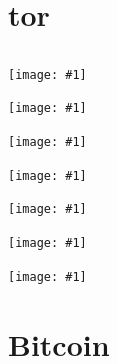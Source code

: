 \documentclass[12pt,english]{beamer}
\newcommand {\framedgraphic}[1] {
    \begin{frame}
        \begin{center}
            \texttt{[image: \#1]}
        \end{center}
    \end{frame}
}
\begin{document}
\section{tor}
\subsection{}

\framedgraphic{./img/tor_presentation/s1.png}

\framedgraphic{./img/tor_presentation/s2.png}

\framedgraphic{./img/tor_presentation/s3.png}

\framedgraphic{./img/tor_presentation/s4.png}

\framedgraphic{./img/tor_presentation/s5.png}

\framedgraphic{./img/tor_presentation/s6.png}

\framedgraphic{./img/tor_presentation/s7.png}



\section{Bitcoin}
\subsection{}
\end{document}
